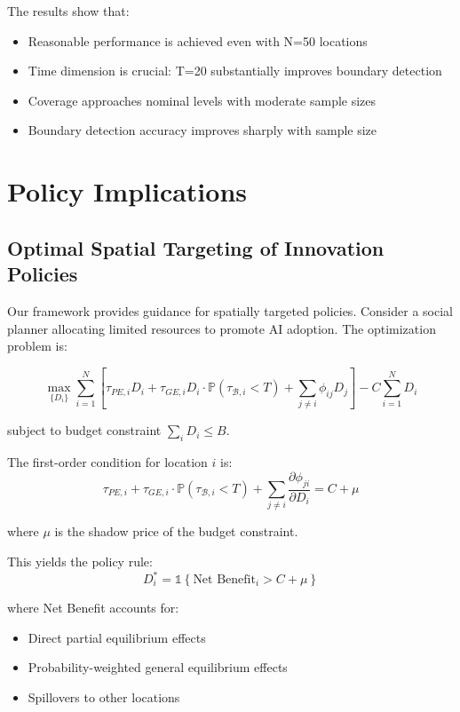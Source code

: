 The results show that:
\begin{itemize}
   \item Reasonable performance is achieved even with N=50 locations
   \item Time dimension is crucial: T=20 substantially improves boundary detection
   \item Coverage approaches nominal levels with moderate sample sizes
   \item Boundary detection accuracy improves sharply with sample size
\end{itemize}

\section{Policy Implications}

\subsection{Optimal Spatial Targeting of Innovation Policies}

Our framework provides guidance for spatially targeted policies. Consider a social planner allocating limited resources to promote AI adoption. The optimization problem is:

\begin{equation}
\max_{\{D_i\}} \sum_{i=1}^N \left[\tau_{PE,i} D_i + \tau_{GE,i} D_i \cdot \mathbb{P}(\tau_{\mathcal{B},i} < T) + \sum_{j \neq i} \phi_{ij} D_j\right] - C\sum_{i=1}^N D_i
\end{equation}

subject to budget constraint $\sum_i D_i \leq B$.

The first-order condition for location $i$ is:
\begin{equation}
\tau_{PE,i} + \tau_{GE,i} \cdot \mathbb{P}(\tau_{\mathcal{B},i} < T) + \sum_{j \neq i} \frac{\partial \phi_{ji}}{\partial D_i} = C + \mu
\end{equation}

where $\mu$ is the shadow price of the budget constraint.

This yields the policy rule:
\begin{equation}
D_i^* = \mathbb{1}\left\{\text{Net Benefit}_i > C + \mu\right\}
\end{equation}

where Net Benefit accounts for:
\begin{itemize}
   \item Direct partial equilibrium effects
   \item Probability-weighted general equilibrium effects
   \item Spillovers to other locations
\end{itemize}

